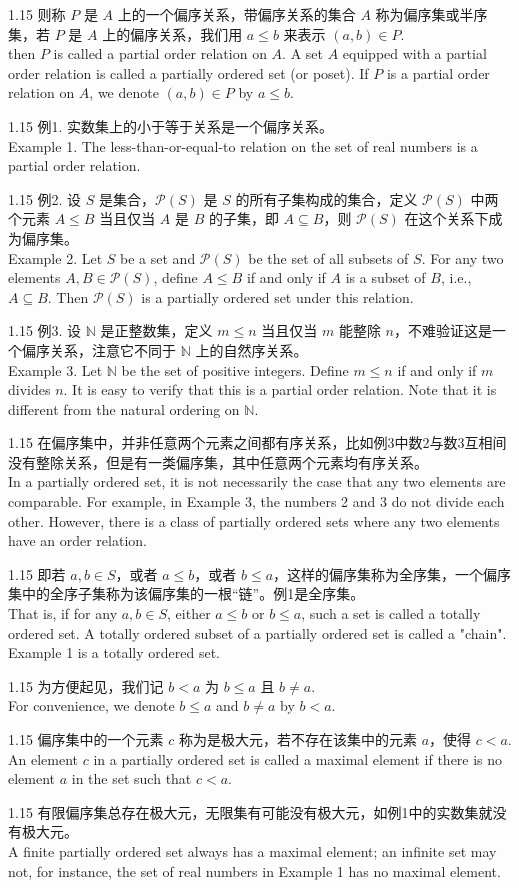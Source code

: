 \documentclass[12pt,a4paper]{article}
\newcommand{\bilingual}[2]{
    \begin{spacing}{1.15} %
        \noindent \normalsize #1 \\[-0.5ex] %
        \small \textcolor{blue!70!black}{#2} %
    \end{spacing}
    \vspace{0.8em} %
}
\begin{document}
\bilingual{则称 $P$ 是 $A$ 上的一个偏序关系，带偏序关系的集合 $A$ 称为偏序集或半序集，若 $P$ 是 $A$ 上的偏序关系，我们用 $a\le b$ 来表示 $(a,b)\in P.$}{then $P$ is called a partial order relation on $A$. A set $A$ equipped with a partial order relation is called a partially ordered set (or poset). If $P$ is a partial order relation on $A$, we denote $(a, b) \in P$ by $a \le b$.}

\bilingual{例1. 实数集上的小于等于关系是一个偏序关系。}{Example 1. The less-than-or-equal-to relation on the set of real numbers is a partial order relation.}

\bilingual{例2. 设 $S$ 是集合，$\mathcal{P}(S)$ 是 $S$ 的所有子集构成的集合，定义 $\mathcal{P}(S)$ 中两个元素 $A\le B$ 当且仅当 $A$ 是 $B$ 的子集，即 $A\subseteq B$，则 $\mathcal{P}(S)$ 在这个关系下成为偏序集。}{Example 2. Let $S$ be a set and $\mathcal{P}(S)$ be the set of all subsets of $S$. For any two elements $A, B \in \mathcal{P}(S)$, define $A \le B$ if and only if $A$ is a subset of $B$, i.e., $A \subseteq B$. Then $\mathcal{P}(S)$ is a partially ordered set under this relation.}

\bilingual{例3. 设 $\mathbb{N}$ 是正整数集，定义 $m\le n$ 当且仅当 $m$ 能整除 $n$，不难验证这是一个偏序关系，注意它不同于 $\mathbb{N}$ 上的自然序关系。}{Example 3. Let $\mathbb{N}$ be the set of positive integers. Define $m \le n$ if and only if $m$ divides $n$. It is easy to verify that this is a partial order relation. Note that it is different from the natural ordering on $\mathbb{N}$.}

\bilingual{在偏序集中，并非任意两个元素之间都有序关系，比如例3中数2与数3互相间没有整除关系，但是有一类偏序集，其中任意两个元素均有序关系。}{In a partially ordered set, it is not necessarily the case that any two elements are comparable. For example, in Example 3, the numbers 2 and 3 do not divide each other. However, there is a class of partially ordered sets where any two elements have an order relation.}

\bilingual{即若 $a, b\in S$，或者 $a\le b$，或者 $b\le a$，这样的偏序集称为全序集，一个偏序集中的全序子集称为该偏序集的一根“链”。例1是全序集。}{That is, if for any $a, b \in S$, either $a \le b$ or $b \le a$, such a set is called a totally ordered set. A totally ordered subset of a partially ordered set is called a "chain". Example 1 is a totally ordered set.}

\bilingual{为方便起见，我们记 $b<a$ 为 $b\le a$ 且 $b\ne a.$}{For convenience, we denote $b \le a$ and $b \ne a$ by $b < a$.}

\bilingual{偏序集中的一个元素 $c$ 称为是极大元，若不存在该集中的元素 $a$，使得 $c<a.$}{An element $c$ in a partially ordered set is called a maximal element if there is no element $a$ in the set such that $c < a$.}

\bilingual{有限偏序集总存在极大元，无限集有可能没有极大元，如例1中的实数集就没有极大元。}{A finite partially ordered set always has a maximal element; an infinite set may not, for instance, the set of real numbers in Example 1 has no maximal element.}
\end{document}
